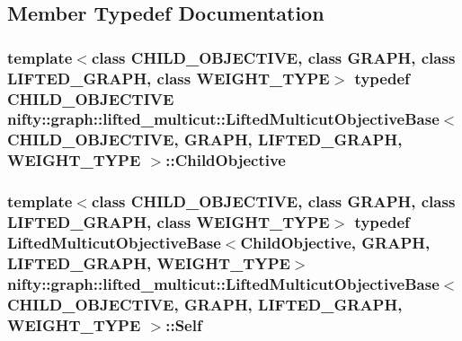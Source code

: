 \subsection{Member Typedef Documentation}
\hypertarget{classnifty_1_1graph_1_1lifted__multicut_1_1LiftedMulticutObjectiveBase_a72e88672e37520bf7bb8bb68a91687ae}{}
\subsubsection[{Child\+Objective}]{\setlength{\rightskip}{0pt plus 5cm}template$<$class C\+H\+I\+L\+D\+\_\+\+O\+B\+J\+E\+C\+T\+I\+V\+E, class G\+R\+A\+P\+H, class L\+I\+F\+T\+E\+D\+\_\+\+G\+R\+A\+P\+H, class W\+E\+I\+G\+H\+T\+\_\+\+T\+Y\+P\+E$>$ typedef C\+H\+I\+L\+D\+\_\+\+O\+B\+J\+E\+C\+T\+I\+V\+E {\bf nifty\+::graph\+::lifted\+\_\+multicut\+::\+Lifted\+Multicut\+Objective\+Base}$<$ C\+H\+I\+L\+D\+\_\+\+O\+B\+J\+E\+C\+T\+I\+V\+E, G\+R\+A\+P\+H, L\+I\+F\+T\+E\+D\+\_\+\+G\+R\+A\+P\+H, W\+E\+I\+G\+H\+T\+\_\+\+T\+Y\+P\+E $>$\+::{\bf Child\+Objective}}\label{classnifty_1_1graph_1_1lifted__multicut_1_1LiftedMulticutObjectiveBase_a72e88672e37520bf7bb8bb68a91687ae}
\hypertarget{classnifty_1_1graph_1_1lifted__multicut_1_1LiftedMulticutObjectiveBase_a5da49e6ae096c39a6832883e8a1abd21}{}
\subsubsection[{Self}]{\setlength{\rightskip}{0pt plus 5cm}template$<$class C\+H\+I\+L\+D\+\_\+\+O\+B\+J\+E\+C\+T\+I\+V\+E, class G\+R\+A\+P\+H, class L\+I\+F\+T\+E\+D\+\_\+\+G\+R\+A\+P\+H, class W\+E\+I\+G\+H\+T\+\_\+\+T\+Y\+P\+E$>$ typedef {\bf Lifted\+Multicut\+Objective\+Base}$<${\bf Child\+Objective}, G\+R\+A\+P\+H, L\+I\+F\+T\+E\+D\+\_\+\+G\+R\+A\+P\+H, W\+E\+I\+G\+H\+T\+\_\+\+T\+Y\+P\+E$>$ {\bf nifty\+::graph\+::lifted\+\_\+multicut\+::\+Lifted\+Multicut\+Objective\+Base}$<$ C\+H\+I\+L\+D\+\_\+\+O\+B\+J\+E\+C\+T\+I\+V\+E, G\+R\+A\+P\+H, L\+I\+F\+T\+E\+D\+\_\+\+G\+R\+A\+P\+H, W\+E\+I\+G\+H\+T\+\_\+\+T\+Y\+P\+E $>$\+::{\bf Self}}\label{classnifty_1_1graph_1_1lifted__multicut_1_1LiftedMulticutObjectiveBase_a5da49e6ae096c39a6832883e8a1abd21}


